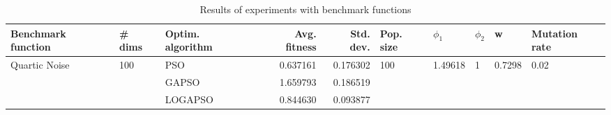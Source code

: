 \begin{table}
\centering
\caption{Results of experiments with benchmark functions}
\begin{tabular}{lllrrlllll}
\toprule
            Benchmark function &              \# dims & Optim. algorithm &  Avg. fitness &  Std. dev. &            Pop. size &               $\phi_{1}$ &         $\phi_{2}$ &                       w &         Mutation rate \\
\midrule
\multirow{3}{*}{Quartic Noise} & \multirow{3}{*}{100} &              PSO &      0.637161 &   0.176302 & \multirow{3}{*}{100} & \multirow{3}{*}{1.49618} & \multirow{3}{*}{1} & \multirow{3}{*}{0.7298} & \multirow{3}{*}{0.02} \\
                               &                      &            GAPSO &      1.659793 &   0.186519 &                      &                          &                    &                         &                       \\
                               &                      &          LOGAPSO &      0.844630 &   0.093877 &                      &                          &                    &                         &                       \\
\bottomrule
\end{tabular}
\end{table}
